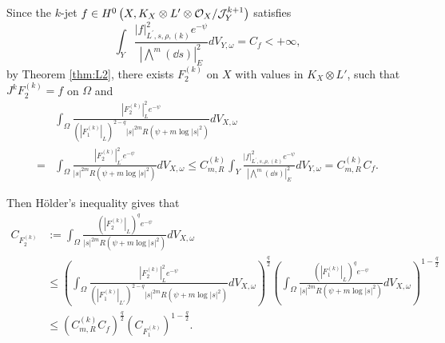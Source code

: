 \documentclass[lang=en,12pt,twoside]{textbook}
\begin{document}
Since the $k$-jet  $f \in H^0\left(X,K_X\otimes L'\otimes {\mathcal O}_X/{\mathcal J}_Y^{k+1}\right)$ satisfies
$$
\int_Y \frac{|f|_{L^{\prime},s,\rho,(k)}^2 e^{-\psi}}{\left|\bigwedge^m(\dd s)\right|_E^2} d V_{Y,\omega}=C_f<+\infty,
$$
by Theorem \ref{thm:L2}, there exists  $F_2^{(k)}$ on $X$ with values in $K_X \otimes L'$, such that $J^k F_2^{(k)}=f$ on $\Omega$ and
$$
\begin{aligned}
&\int_\Omega \frac{\left|F_2^{(k)}\right|_{L}^2 e^{-\psi}}{\left(\left|F_1^{(k)}\right|_L\right)^{2-q}  |s|^{2m} R(\psi+m\log |s|^2)} d V_{X,\omega}  \\
=&\int_\Omega \frac{\left|F_2^{(k)}\right|_{L^{\prime}}^2 e^{-\psi}}{|s|^{2m} R(\psi+m\log |s|^2)} d V_{X,\omega}  
 \leq C_{m,R}^{(k)} \int_Y \frac{|f|_{L^{\prime},s,\rho,(k)}^2 e^{-\psi}}{\left|\bigwedge^m(\dd s)\right|_E^2} d V_{Y,\omega}  
 =C_{m,R}^{(k)} C_f .
\end{aligned}
$$

Then H\"older's inequality gives that
$$
\begin{aligned}
C_{F_2^{(k)}}  &:=\int_\Omega \frac{\left(\left|F_2^{(k)}\right|_{L}\right)^q   e^{-\psi}}{|s|^{2m} R(\psi+m\log |s|^2)} d V_{X,\omega} \\
& \leq\left(\int_\Omega \frac{\left|F_2^{(k)}\right|_{L}^2  e^{-\psi}}{\left(\left|F_1^{(k)}\right|_{L'}\right)^{2-q} |s|^{2m} R(\psi+m\log |s|^2)} d V_{X,\omega}\right)^{\frac{q}{2}}\left(\int_\Omega \frac{\left(\left|F_1^{(k)}\right|_{L}\right)^q e^{-\psi}}{|s|^{2m} R(\psi+m\log |s|^2)} d V_{X,\omega}\right)^{1-\frac{q}{2}} \\
& \leq\left(C_{m,R}^{(k)} C_f\right)^{\frac{q}{2}}\left(C_{F_1^{(k)}}\right)^{1-\frac{q}{2}} .
\end{aligned}
$$
\end{document}
